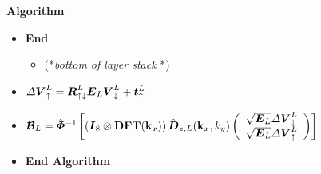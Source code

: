 \begin{figure}
{\begin{minipage} {140.0mm}{\bf  Algorithm}
\begin{itemize}
\begin{itemize}
\item $
{\CB B}_{\rho}=\hat{\bmi \Phi}{}^{-1}\left[\left({\bmi I}_8\otimes 
{\bf DFT}({\bf k}_{x}) \right)\hat{\bmi  D}_{z,\rho}({\bf k}_{x},{k}_{y})
\left({\begin{array}{c}
\sqrt{{\bmi E}_{\rho}}{\mit \Delta}{{\bmi V}}_{ \downarrow }^{\rho}\\ 
\sqrt{{\bmi E}_{\rho}}{\mit \Delta}{{\bmi V}}_{ \uparrow }^{\rho}
\end{array}}\right)\right]
$

\end{itemize}


\item {\bf  End}





\begin{itemize}
\item  (*{\em bottom of layer stack\/ }*) 
\end{itemize}

\item  	$
{\mit \Delta}{{\mbox{\boldmath$\mit V$\unboldmath}}}_{ \uparrow }^{L}=
{\mbox{\boldmath$\mit R$\unboldmath}}_{ \uparrow \downarrow }^{L}
{\mbox{\boldmath$\mit E$\unboldmath}}_{L} {{\mbox{\boldmath$\mit V$\unboldmath}}}_{ \downarrow }^{L} +{\mbox{\boldmath$\mit t$\unboldmath}}_{ \uparrow }^{L}$

\item $
{\mbox{\boldmath$\cal B$\unboldmath}}_{L}=\hat{\mbox{\boldmath$\mit \Phi$\unboldmath}}{}^{-1}\left[\left({\mbox{\boldmath$\mit I$\unboldmath}}_8\otimes 
{\bf DFT}({\bf k}_{x}) \right)\hat{\mbox{\boldmath$\mit D$\unboldmath}}_{z,L}({\bf k}_{x},{k}_{y})
\left({\begin{array}{c}
\sqrt{{\mbox{\boldmath$\mit E$\unboldmath}}_{L}}{\mit \Delta}{{\mbox{\boldmath$\mit V$\unboldmath}}}_{ \downarrow }^{L}\\ 
\sqrt{{\mbox{\boldmath$\mit E$\unboldmath}}_{L}}{\mit \Delta}{{\mbox{\boldmath$\mit V$\unboldmath}}}_{ \uparrow }^{L}
\end{array}}\right)\right]
$


\item{\bf End Algorithm}

\end{itemize}

\vspace{2mm}

\end{minipage}
}
\end{figure}



